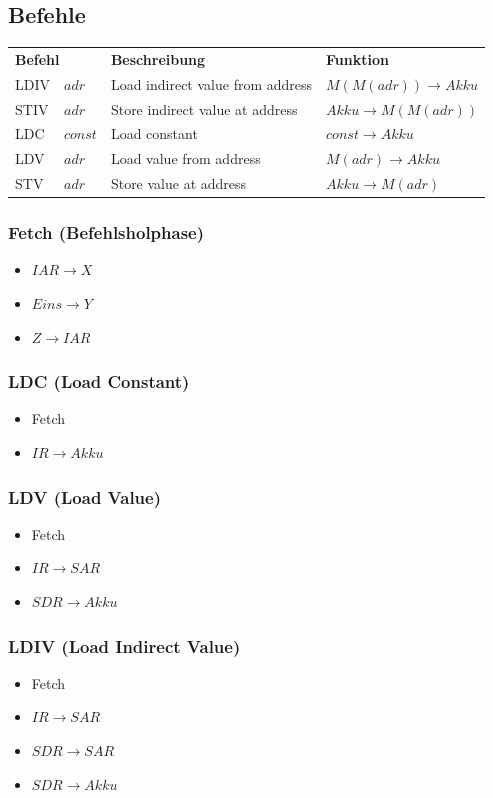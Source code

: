 \documentclass[a4paper,portrait]{scrartcl}
\begin{document}
\subsection{Befehle}
\begin{tabular}{llll}
\multicolumn{2}{l}{\textbf{Befehl}}&\textbf{Beschreibung}&\textbf{Funktion} \\
LDIV &$adr$&Load indirect value from address&$ M(M(adr))\rightarrow Akku $ \\
STIV &$adr$&Store indirect value at address&$Akku \rightarrow M(M(adr))$ \\
LDC &$const$&Load constant&$const \rightarrow Akku$ \\
LDV &$adr$&Load value from address&$M(adr) \rightarrow Akku$ \\
STV &$adr$&Store value at address&$Akku \rightarrow M(adr)$
\end{tabular}

\subsubsection{Fetch (Befehlsholphase)}
\begin{itemize}
\item $IAR \rightarrow X$
\item $Eins \rightarrow Y$
\item $Z \rightarrow IAR$
\end{itemize}
\subsubsection{LDC (Load Constant)}
\begin{itemize}
\item Fetch
\item $IR \rightarrow Akku$
\end{itemize}
\subsubsection{LDV (Load Value)}
\begin{itemize}
\item Fetch
\item $IR \rightarrow SAR$
\item $SDR \rightarrow Akku$
\end{itemize}
\subsubsection{LDIV (Load Indirect Value)}
\begin{itemize}
\item Fetch
\item $IR \rightarrow SAR$
\item $SDR \rightarrow SAR$
\item $SDR \rightarrow Akku$
\end{itemize}
\end{document}
